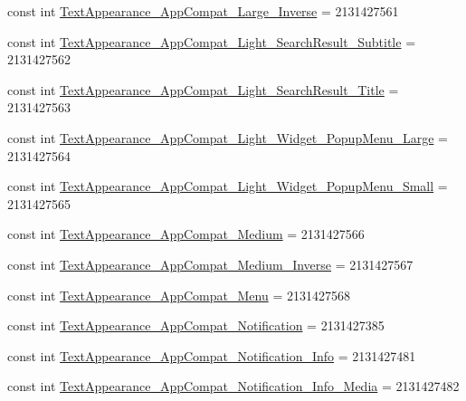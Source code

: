 \begin{DoxyCompactItemize}
\item 
const int \mbox{\hyperlink{class_f_w_p_s___app_1_1_droid_1_1_resource_1_1_style_a69e0a60ed23c20e393fe8cfc4006c7b7}{Text\+Appearance\+\_\+\+App\+Compat\+\_\+\+Large\+\_\+\+Inverse}} = 2131427561
\item 
const int \mbox{\hyperlink{class_f_w_p_s___app_1_1_droid_1_1_resource_1_1_style_a0cef940f2f4e19150d0415699bd71e6a}{Text\+Appearance\+\_\+\+App\+Compat\+\_\+\+Light\+\_\+\+Search\+Result\+\_\+\+Subtitle}} = 2131427562
\item 
const int \mbox{\hyperlink{class_f_w_p_s___app_1_1_droid_1_1_resource_1_1_style_ab1aeaf0d44e830e3b7e2033ca554ebdc}{Text\+Appearance\+\_\+\+App\+Compat\+\_\+\+Light\+\_\+\+Search\+Result\+\_\+\+Title}} = 2131427563
\item 
const int \mbox{\hyperlink{class_f_w_p_s___app_1_1_droid_1_1_resource_1_1_style_a6bdb099303f11059e52f951a485ad158}{Text\+Appearance\+\_\+\+App\+Compat\+\_\+\+Light\+\_\+\+Widget\+\_\+\+Popup\+Menu\+\_\+\+Large}} = 2131427564
\item 
const int \mbox{\hyperlink{class_f_w_p_s___app_1_1_droid_1_1_resource_1_1_style_af165b67b8e8799861dea4349192c792d}{Text\+Appearance\+\_\+\+App\+Compat\+\_\+\+Light\+\_\+\+Widget\+\_\+\+Popup\+Menu\+\_\+\+Small}} = 2131427565
\item 
const int \mbox{\hyperlink{class_f_w_p_s___app_1_1_droid_1_1_resource_1_1_style_a00f17f3a5ed9ec632274e57de7c74b79}{Text\+Appearance\+\_\+\+App\+Compat\+\_\+\+Medium}} = 2131427566
\item 
const int \mbox{\hyperlink{class_f_w_p_s___app_1_1_droid_1_1_resource_1_1_style_ad591bf6c724c153c144ced141cf213cf}{Text\+Appearance\+\_\+\+App\+Compat\+\_\+\+Medium\+\_\+\+Inverse}} = 2131427567
\item 
const int \mbox{\hyperlink{class_f_w_p_s___app_1_1_droid_1_1_resource_1_1_style_aaf3d1f22d5dd0e7234b0d7996dedec79}{Text\+Appearance\+\_\+\+App\+Compat\+\_\+\+Menu}} = 2131427568
\item 
const int \mbox{\hyperlink{class_f_w_p_s___app_1_1_droid_1_1_resource_1_1_style_a712a425ca19563ed5ea7806644bebd13}{Text\+Appearance\+\_\+\+App\+Compat\+\_\+\+Notification}} = 2131427385
\item 
const int \mbox{\hyperlink{class_f_w_p_s___app_1_1_droid_1_1_resource_1_1_style_a29f13c4c393769def4b07f92ffa5597b}{Text\+Appearance\+\_\+\+App\+Compat\+\_\+\+Notification\+\_\+\+Info}} = 2131427481
\item 
const int \mbox{\hyperlink{class_f_w_p_s___app_1_1_droid_1_1_resource_1_1_style_a703dac7e16774c1cf658ebaa3b643b3c}{Text\+Appearance\+\_\+\+App\+Compat\+\_\+\+Notification\+\_\+\+Info\+\_\+\+Media}} = 2131427482

\end{DoxyCompactItemize}
